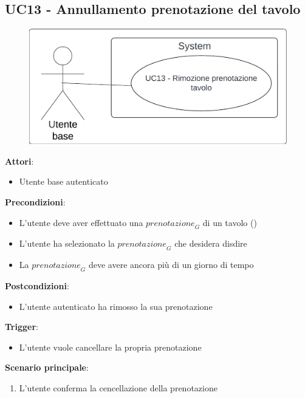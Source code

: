 \subsection{UC13 - Annullamento prenotazione del tavolo} \label{usecase:13}
\begin{figure}[H]
\centering
\includegraphics[width=0.75\linewidth]{ucd/ucd13.png}
\end{figure}
\textbf{Attori}:
\begin{itemize}
    \item Utente base autenticato
\end{itemize}
\textbf{Precondizioni}:
\begin{itemize}
    \item L'utente deve aver effettuato una $\textit{prenotazione}_G$ di un tavolo ()
    \item L'utente ha selezionato la $\textit{prenotazione}_G$ che desidera disdire
    \item La $\textit{prenotazione}_G$ deve avere ancora più di un giorno di tempo
\end{itemize}
\textbf{Postcondizioni}:
\begin{itemize}
    \item L'utente autenticato ha rimosso la sua prenotazione
\end{itemize}
\textbf{Trigger}:
\begin{itemize}
    \item L'utente vuole cancellare la propria prenotazione
\end{itemize}
\textbf{Scenario principale}:
\begin{enumerate}
    \item L'utente conferma la cencellazione della prenotazione
\end{enumerate}
\newpage
